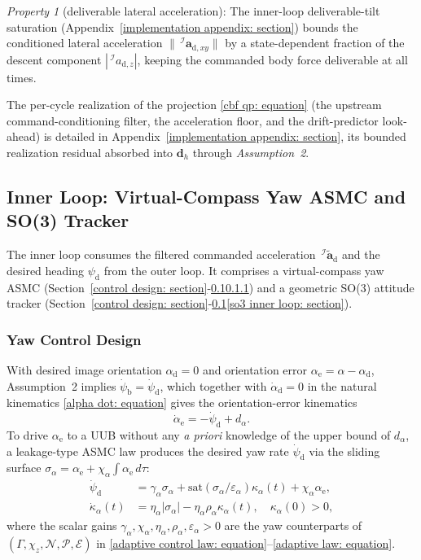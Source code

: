 \documentclass{IEEEtaes}
\begin{document}
\textit{Property 1} (deliverable lateral acceleration): The inner-loop deliverable-tilt saturation (Appendix~\ref{implementation appendix: section}) bounds the conditioned lateral acceleration $\|\,^\mathcal{I}\boldsymbol{a}_{\text{d},xy}\|$ by a state-dependent fraction of the descent component $|\,^\mathcal{I}a_{\text{d},z}|$, keeping the commanded body force deliverable at all times.

The per-cycle realization of the projection \eqref{cbf qp: equation} (the upstream command-conditioning filter, the acceleration floor, and the drift-predictor look-ahead) is detailed in Appendix~\ref{implementation appendix: section}, its bounded realization residual absorbed into $\boldsymbol{d}_h$ through \textit{Assumption~2}.

\subsection{Inner Loop: Virtual-Compass Yaw ASMC and SO(3) Tracker} \label{inner loop: section}
The inner loop consumes the filtered commanded acceleration $\,^\mathcal{I}\tilde{\boldsymbol{a}}_\text{d}$ and the desired heading $\psi_\text{d}$ from the outer loop. It comprises a virtual-compass yaw ASMC (Section~\ref{control design: section}-\ref{inner loop: section}\ref{yaw control: section}) and a geometric SO(3) attitude tracker (Section~\ref{control design: section}-\ref{inner loop: section}\ref{so3 inner loop: section}).

\subsubsection{Yaw Control Design} \label{yaw control: section}
With desired image orientation $\alpha_\text{d}=0$ and orientation error $\alpha_\text{e}=\alpha-\alpha_\text{d}$, Assumption~2 implies $\dot{\psi}_\text{b}=\dot{\psi}_\text{d}$, which together with $\dot{\alpha}_\text{d}=0$ in the natural kinematics \eqref{alpha dot: equation} gives the orientation-error kinematics
\begin{equation} \label{alpha_e_dot: equation}
    \dot{\alpha}_\text{e} = -\dot{\psi}_\text{d} + d_{\alpha}.
\end{equation}
To drive $\alpha_\text{e}$ to a UUB without any \emph{a priori} knowledge of the upper bound of $d_{\alpha}$, a leakage-type ASMC law produces the desired yaw rate $\dot{\psi}_\text{d}$ via the sliding surface $\sigma_{\alpha}=\alpha_\text{e}+\chi_{\alpha}\!\int\alpha_\text{e}\,d\tau$:
\begin{align} \label{yaw control law: equation}
    \dot{\psi}_\text{d} &= \gamma_{\alpha}\sigma_{\alpha} + \text{sat}(\sigma_{\alpha}/\varepsilon_{\alpha})\kappa_{\alpha}(t) + \chi_{\alpha} \alpha_\text{e}, \nonumber\\
    \dot{\kappa}_{\alpha}(t) &= \eta_{\alpha}|\sigma_{\alpha}| - \eta_{\alpha}\rho_{\alpha}\kappa_{\alpha}(t),\quad\kappa_{\alpha}(0)>0,
\end{align}
where the scalar gains $\gamma_{\alpha}, \chi_{\alpha}, \eta_{\alpha}, \rho_{\alpha}, \varepsilon_{\alpha} > 0$ are the yaw counterparts of $(\Gamma,\chi_z,\mathcal{N},\mathcal{P},\mathcal{E})$ in \eqref{adaptive control law: equation}--\eqref{adaptive law: equation}.
\end{document}
